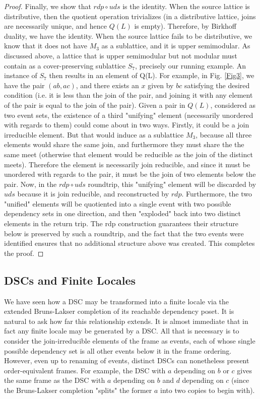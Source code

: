 \documentclass[hoptionsi,review,format=acmsmall]{acmart}
\theoremstyle{definition}
\begin{document}
\begin{proof}
Finally, we show that \(rdp \circ uds\) is the identity. When the source lattice is distributive, then the quotient operation trivializes (in a distributive lattice, joins are necessarily unique, and hence \(Q(L)\) is empty). Therefore, by Birkhoff duality, we have the identity. When the source lattice fails to be distributive, we know that it does not have \(M_3\) as a sublattice, and it is upper semimodular. As discussed above, a lattice that is upper semimodular but not modular must contain as a cover-preserving sublattice \(S_7\), precisely our running example. An instance of \(S_7\) then results in an element of Q(L). For example, in Fig. \ref{Fig3},  we have the pair \((ab,ac)\), and there exists an \(x\) given by \(bc\) satisfying the desired condition (i.e. it is less than the join of the pair, and joining it with any element of the pair is equal to the join of the pair). Given a pair in \(Q(L)\), considered as two event sets, the existence of a third "unifying" element (necessarily unordered with regards to them) could come about in two ways. Firstly, it could be a join irreducible element. But that would induce as a sublattice \(M_3\), because all three elements would share the same join, and furthermore they must share the the same meet (otherwise that element would be reducible as the join of the distinct meets). Therefore the element is necessarily join reducible, and since it must be unordered with regards to the pair, it must be the join of two elements below the pair. Now, in the \(rdp \circ uds\) roundtrip, this "unifying" element will be discarded by \(uds\) because it is join reducible, and reconstructed by \(rdp\). Furthermore, the two "unified" elements will be quotiented into a single event with two possible dependency sets in one direction, and then "exploded" back into two distinct elements in the return trip. The rdp construction guarantees their structure below is preserved by such a roundtrip, and the fact that the two events were identified ensures that no additional structure above was created. This completes the proof.
\end{proof}

\subsection{DSCs and Finite Locales}

We have seen how a DSC may be transformed into a finite locale via the extended Bruns-Lakser completion of its reachable dependency poset. It is natural to ask how far this relationship extends. It is almost immediate that in fact any finite locale may be generated by a DSC. All that is necessary is to consider the join-irreducible elements of the frame as events, each of whose single possible dependency set is all other events below it in the frame ordering. However, even up to renaming of events, distinct DSCs can nonetheless present order-equivalent frames. For example, the DSC with \(a\) depending on \(b\) or \(c\) gives the same frame as the DSC with \(a\) depending on \(b\) and \(d\) depending on \(c\) (since the Bruns-Lakser completion "splits" the former \(a\) into two copies to begin with). 
\end{document}
